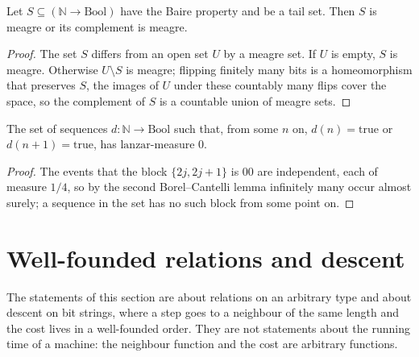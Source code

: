 \begin{theorem}
  \label{thm:infinite-cero-uno-topologica}
  \leanok
  Let $S \subseteq (\mathbb{N} \to \mathrm{Bool})$ have the Baire property and be a tail set. Then $S$ is meagre or its
  complement is meagre.
\end{theorem}

\begin{proof}
  \leanok
  The set $S$ differs from an open set $U$ by a meagre set. If $U$ is empty, $S$ is meagre. Otherwise $U \setminus S$ is
  meagre; flipping finitely many bits is a homeomorphism that preserves $S$, the images of $U$ under these countably many
  flips cover the space, so the complement of $S$ is a countable union of meagre sets.
\end{proof}

\begin{theorem}
  \label{thm:infinite-sin-dos-ceros-nulo}
  \leanok
  The set of sequences $d : \mathbb{N} \to \mathrm{Bool}$ such that, from some $n$ on, $d(n) = \mathrm{true}$ or
  $d(n+1) = \mathrm{true}$, has $\mathrm{lanzar}$-measure $0$.
\end{theorem}

\begin{proof}
  \leanok
  The events that the block $\{2j, 2j+1\}$ is $00$ are independent, each of measure $1/4$, so by the second
  Borel--Cantelli lemma infinitely many occur almost surely; a sequence in the set has no such block from some point on.
\end{proof}

\section{Well-founded relations and descent}
\label{sec:infinite-wellfounded}

The statements of this section are about relations on an arbitrary type and about descent on bit strings, where a
step goes to a neighbour of the same length and the cost lives in a well-founded order. They are not statements about
the running time of a machine: the neighbour function and the cost are arbitrary functions.

